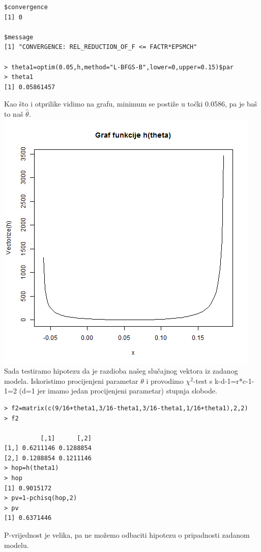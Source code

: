 \documentclass[11pt]{article}
\begin{document}
\begin{enumerate}[(a)]
\begin{verbatim}
$convergence
[1] 0

$message
[1] "CONVERGENCE: REL_REDUCTION_OF_F <= FACTR*EPSMCH"

> theta1=optim(0.05,h,method="L-BFGS-B",lower=0,upper=0.15)$par
> theta1
[1] 0.05861457
\end{verbatim}
Kao što i otprilike vidimo na grafu, minimum se postiže u točki 0.0586, pa je baš to naš $\hat{\theta}$. \\
\includegraphics[scale=0.45]{4.png}\\
Sada testiramo hipotezu da je razdioba našeg slučajnog vektora iz zadanog modela. Iskoristimo procijenjeni parametar $\theta$ i provodimo $\chi^2$-test s k-d-1=r*c-1-1=2 (d=1 jer imamo jedan procijenjeni parametar) stupnja slobode. 
\begin{verbatim}
> f2=matrix(c(9/16+theta1,3/16-theta1,3/16-theta1,1/16+theta1),2,2)
> f2

          [,1]      [,2]
[1,] 0.6211146 0.1288854
[2,] 0.1288854 0.1211146
> hop=h(theta1)
> hop
[1] 0.9015172
> pv=1-pchisq(hop,2)
> pv
[1] 0.6371446
\end{verbatim}
P-vrijednost je velika, pa ne možemo odbaciti hipotezu o pripadnosti zadanom modelu.\\


\end{enumerate}
\end{document}
